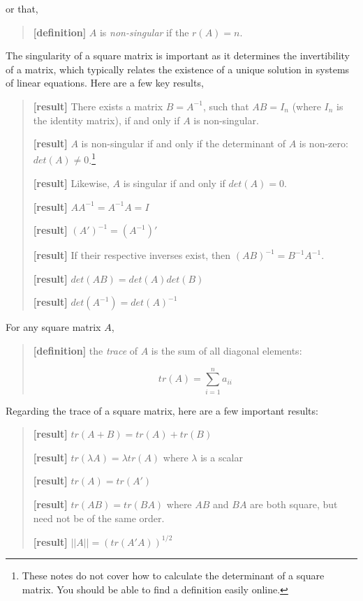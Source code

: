 \documentclass[
  letterpaper,
  DIV=11,
  numbers=noendperiod]{scrreprt}
\begin{document}
or that,

\begin{quote}
\textbf{{[}definition{]}} \(A\) is \emph{non-singular} if the
\(r(A)=n\).
\end{quote}

The singularity of a square matrix is important as it determines the
invertibility of a matrix, which typically relates the existence of a
unique solution in systems of linear equations. Here are a few key
results,

\begin{quote}
\textbf{{[}result{]}} There exists a matrix \(B=A^{-1}\), such that
\(AB=I_n\) (where \(I_n\) is the identity matrix), if and only if \(A\)
is non-singular.

\textbf{{[}result{]}} \(A\) is non-singular if and only if the
determinant of \(A\) is non-zero: \(det(A)\neq0\).\footnote{These notes
  do not cover how to calculate the determinant of a square matrix. You
  should be able to find a definition easily online.}

\textbf{{[}result{]}} Likewise, \(A\) is singular if and only if
\(det(A)=0\).

\textbf{{[}result{]}} \(AA^{-1}=A^{-1}A=I\)

\textbf{{[}result{]}} \((A')^{-1}=(A^{-1})'\)

\textbf{{[}result{]}} If their respective inverses exist, then
\((AB)^{-1}=B^{-1}A^{-1}\).

\textbf{{[}result{]}} \(det(AB)=det(A)det(B)\)

\textbf{{[}result{]}} \(det(A^{-1})=det(A)^{-1}\)
\end{quote}

For any square matrix \(A\),

\begin{quote}
\textbf{{[}definition{]}} the \emph{trace} of \(A\) is the sum of all
diagonal elements:

\[
tr(A) = \sum_{i=1}^na_{ii}
\]
\end{quote}

Regarding the trace of a square matrix, here are a few important
results:

\begin{quote}
\textbf{{[}result{]}} \(tr(A+B) = tr(A) + tr(B)\)

\textbf{{[}result{]}} \(tr(\lambda A) = \lambda tr(A)\) where
\(\lambda\) is a scalar

\textbf{{[}result{]}} \(tr(A) = tr(A')\)

\textbf{{[}result{]}} \(tr(AB) = tr(BA)\) where \(AB\) and \(BA\) are
both square, but need not be of the same order.

\textbf{{[}result{]}} \(||A|| = (tr(A'A))^{1/2}\)
\end{quote}
\end{document}

